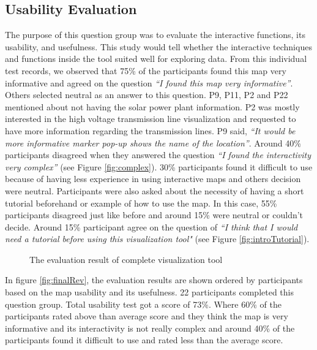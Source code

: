 \subsection*{Usability Evaluation}

The purpose of this question group was to evaluate the interactive functions, its usability, and usefulness. This study would tell whether the interactive techniques and functions inside the tool suited well for exploring data. From this individual test records, we observed that 75\% of the participants found this map very informative and agreed on the question \textit{“I found this map very informative”}. Others selected neutral as an answer to this question. P9, P11, P2 and P22 mentioned about not having the solar power plant information. P2 was mostly interested in the high voltage transmission line visualization and requested to have more information regarding the transmission lines. P9 said, \textit{“It would be more informative marker pop-up shows the name of the location”}. Around 40\% participants disagreed when they answered the question \textit{“I found the interactivity very complex”} (see Figure \ref{fig:complex}). 30\% participants found it difficult to use because of having less experience in using interactive maps and others decision were neutral. Participants were also asked about the necessity of having a short tutorial beforehand or example of how to use the map. In this case, 55\% participants disagreed just like before and around 15\% were neutral or couldn't decide. Around 15\% participant agree on the question of \textit{“I think that I would need a tutorial before using this visualization tool"} (see Figure \ref{fig:introTutorial}). 

\begin{figure}
  \begin{center}
\hfill
{}
\hfill
\caption{The evaluation result of complete visualization tool}
\label{fig:selfExp}
\end{center}
\end{figure}

In figure \ref{fig:finalRev}, the evaluation results are shown ordered by participants based on the map usability and its usefulness. 22 participants completed this question group. Total usability test got a score of 73\%. Where 60\% of the participants rated above than average score and they think the map is very informative and its interactivity is not really complex and around 40\% of the participants found it difficult to use and rated less than the average score.

